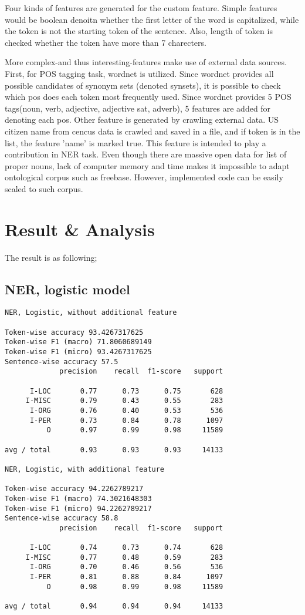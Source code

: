 \documentclass[twoside]{article}
\begin{document}
Four kinds of features are generated for the custom feature. Simple features would be boolean denoitn whether the first letter of the word is capitalized, while the token is not the starting token of the sentence. Also, length of token is checked whether the token have more than 7 charecters. 

More complex-and thus interesting-features make use of external data sources. First, for POS tagging task, wordnet is utilized. Since wordnet provides all possible candidates of synonym sets (denoted synsets), it is possible to check which pos does each token most frequently used. Since wordnet provides 5 POS tags(noun, verb, adjective, adjective sat, adverb), 5 features are added for denoting each pos. Other feature is generated by crawling external data. US citizen name from cencus data is crawled and saved in a file, and if token is in the list, the feature 'name' is marked true. This feature is intended to play a contribution in NER task. Even though there are massive open data for list of proper nouns, lack of computer memory and time makes it impossible to adapt ontological corpus such as freebase. However, implemented code can be easily scaled to such corpus. 


\section{Result \& Analysis} 

The result is as following; 

\subsection{NER, logistic model} 

\begin{lstlisting}
NER, Logistic, without additional feature

Token-wise accuracy 93.4267317625
Token-wise F1 (macro) 71.8060689149
Token-wise F1 (micro) 93.4267317625
Sentence-wise accuracy 57.5
             precision    recall  f1-score   support

      I-LOC       0.77      0.73      0.75       628
     I-MISC       0.79      0.43      0.55       283
      I-ORG       0.76      0.40      0.53       536
      I-PER       0.73      0.84      0.78      1097
          O       0.97      0.99      0.98     11589

avg / total       0.93      0.93      0.93     14133

NER, Logistic, with additional feature

Token-wise accuracy 94.2262789217
Token-wise F1 (macro) 74.3021648303
Token-wise F1 (micro) 94.2262789217
Sentence-wise accuracy 58.8
             precision    recall  f1-score   support

      I-LOC       0.74      0.73      0.74       628
     I-MISC       0.77      0.48      0.59       283
      I-ORG       0.70      0.46      0.56       536
      I-PER       0.81      0.88      0.84      1097
          O       0.98      0.99      0.98     11589

avg / total       0.94      0.94      0.94     14133


\end{lstlisting} 
\end{document}
